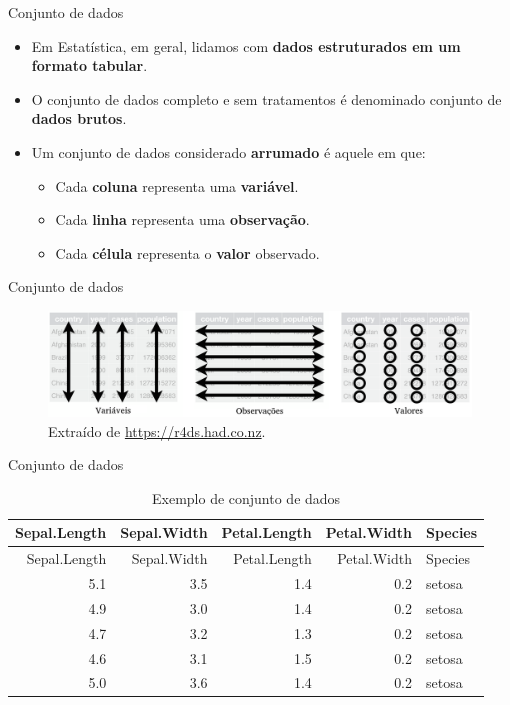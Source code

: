 \documentclass[
  ignorenonframetext,
  serif,
  professionalfont,
  usenames,
  dvipsnames,
  aspectratio = 169]{beamer}
\providecommand{\tightlist}{%
  \setlength{\itemsep}{0pt}\setlength{\parskip}{0pt}}
\renewcommand{\tightlist}{%
  \setlength{\itemsep}{0\baselineskip}
  \setlength{\parskip}{0.25\baselineskip}
}
\begin{document}
\begin{frame}{Conjunto de dados}
\protect\hypertarget{conjunto-de-dados}{}
\begin{itemize}
\item
  Em Estatística, em geral, lidamos com
  \textbf{dados estruturados em um formato tabular}.
\item
  O conjunto de dados completo e sem tratamentos é denominado conjunto
  de \textbf{dados brutos}.
\item
  Um conjunto de dados considerado \textbf{arrumado} é aquele em que:

  \begin{itemize}
  \tightlist
  \item
    Cada \textbf{coluna} representa uma \textbf{variável}.
  \item
    Cada \textbf{linha} representa uma \textbf{observação}.
  \item
    Cada \textbf{célula} representa o \textbf{valor} observado.
  \end{itemize}
\end{itemize}
\end{frame}

\begin{frame}{Conjunto de dados}
\protect\hypertarget{conjunto-de-dados-1}{}
\begin{figure}

{\centering \includegraphics[width=0.9\linewidth]{./img/tidy-data} 

}

\caption{Extraído de \href{https://r4ds.had.co.nz/tidy-data.html}{https://r4ds.had.co.nz}.}\label{fig:unnamed-chunk-3}
\end{figure}
\end{frame}

\begin{frame}{Conjunto de dados}
\protect\hypertarget{conjunto-de-dados-2}{}
\begin{longtable}[]{@{}rrrrl@{}}
\caption{Exemplo de conjunto de dados}\tabularnewline
\toprule()
Sepal.Length & Sepal.Width & Petal.Length & Petal.Width & Species \\
\midrule()
\endfirsthead
\toprule()
Sepal.Length & Sepal.Width & Petal.Length & Petal.Width & Species \\
\midrule()
\endhead
5.1 & 3.5 & 1.4 & 0.2 & setosa \\
4.9 & 3.0 & 1.4 & 0.2 & setosa \\
4.7 & 3.2 & 1.3 & 0.2 & setosa \\
4.6 & 3.1 & 1.5 & 0.2 & setosa \\
5.0 & 3.6 & 1.4 & 0.2 & setosa \\
\bottomrule()
\end{longtable}
\end{frame}
\end{document}
